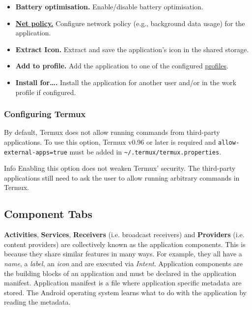 \begin{itemize}
    \item \textbf{Battery optimisation.} Enable/disable battery optimisation.

    \item \hyperref[sec:net-policy]{\textbf{Net policy.}} Configure network policy (e.g., background data usage) for the
    application.

    \item \textbf{Extract Icon.} Extract and save the application's icon in the shared storage.

    \item \textbf{Add to profile.} Add the application to one of the configured \hyperref[sec:profile-page]{profiles}.

    \item \textbf{Install for….} Install the application for another user and/or in the work profile if configured.
\end{itemize}

\subsubsection{Configuring Termux}\label{subsubsec:config-termux} %
By default, Termux does not allow running commands from third-party applications. To use this option, Termux v0.96 or
later is required and \texttt{allow-external-apps=true} must be added in \texttt{\textasciitilde/.termux/termux.properties}.

\begin{tip}{Info}
    Enabling this option does not weaken Termux' security. The third-party applications still need to ask the user to
    allow running arbitrary commands in Termux.
\end{tip}

\subsection{Component Tabs}\label{subsec:component-tabs} %
\textbf{Activities}, \textbf{Services}, \textbf{Receivers} (i.e. broadcast receivers) and \textbf{Providers}
(i.e. content providers) are collectively known as the application components. This is because they share
similar features in many ways. For example, they all have a \textit{name}, a \textit{label}, an \textit{icon} and are
executed via \textit{Intent}. Application components are the building blocks of an application and must be declared in
the application manifest. Application manifest is a file where application specific metadata are stored. The Android
operating system learns what to do with the application by reading the metadata.

